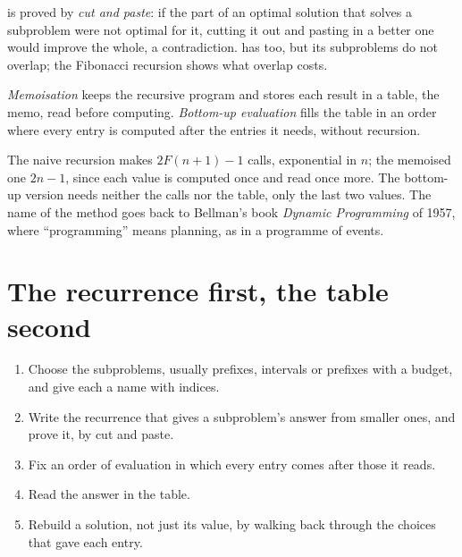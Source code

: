  is proved by \emph{cut and paste}: if the part of an optimal solution that solves a subproblem were
not optimal for it, cutting it out and pasting in a better one would improve the whole, a contradiction.  has  too, but its subproblems do not overlap; the Fibonacci recursion shows what overlap
costs.

\begin{definition}\label{def:b1:dynamic-programming:memo}
\emph{Memoisation} keeps the recursive program and stores each result in a table, the memo, read
before computing. \emph{Bottom-up evaluation} fills the table in an order where every entry
is computed after the entries it needs, without recursion.
\end{definition}

\label{lst:b1:dynamic-programming:fib}

\label{out:b1:dynamic-programming:fib}

The naive recursion makes $2F(n + 1) - 1$ calls, exponential in $n$; the memoised one $2n - 1$, since each value is
computed once and read once more. The bottom-up version needs neither the calls nor the table, only the last two
values. The name of the method goes back to Bellman's book \emph{Dynamic Programming} of 1957, where ``programming''
means planning, as in a programme of events.

\section{The recurrence first, the table second}\label{sec:b1:dynamic-programming:method}

\begin{method}\label{met:b1:dynamic-programming:design}
\begin{enumerate}
\item Choose the subproblems, usually prefixes, intervals or prefixes with a budget, and give each a name with
indices.
\item Write the recurrence that gives a subproblem's answer from smaller ones, and prove it, by cut and paste.
\item Fix an order of evaluation in which every entry comes after those it reads.
\item Read the answer in the table.
\item Rebuild a solution, not just its value, by walking back through the choices that gave each entry.
\end{enumerate}
\end{method}

